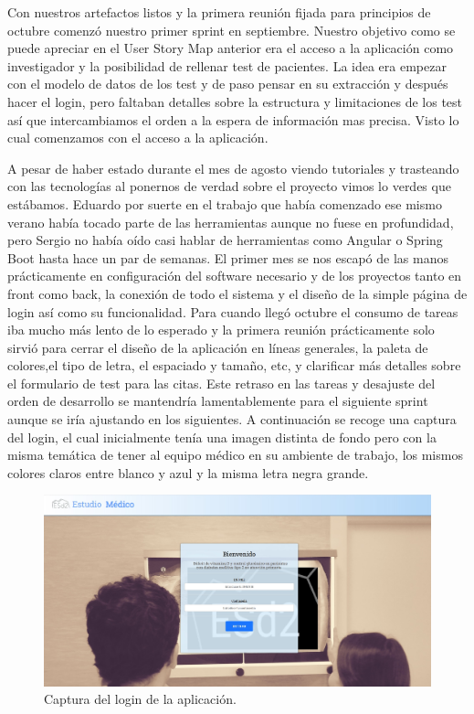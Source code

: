 Con nuestros artefactos listos y la primera reunión fijada para principios de octubre comenzó nuestro primer sprint en septiembre. Nuestro objetivo como se puede apreciar en el User Story Map anterior era el acceso a la aplicación como investigador y la posibilidad de rellenar test de pacientes. La idea era empezar con el modelo de datos de los test y de paso pensar en su extracción y después hacer el login, pero faltaban detalles sobre la estructura y limitaciones de los test así que intercambiamos el orden a la espera de información mas precisa. Visto lo cual comenzamos con el acceso a la aplicación.
\newline

A pesar de haber estado durante el mes de agosto viendo tutoriales y trasteando con las tecnologías al ponernos de verdad sobre el proyecto vimos lo verdes que estábamos. Eduardo por suerte en el trabajo que había comenzado ese mismo verano había tocado parte de las herramientas aunque no fuese en profundidad, pero Sergio no había oído casi hablar de herramientas como Angular o Spring Boot hasta hace un par de semanas. El primer mes se nos escapó de las manos prácticamente en configuración del software necesario y de los proyectos tanto en front como back, la conexión de todo el sistema y el diseño de la simple página de login así como su funcionalidad. Para cuando llegó octubre el consumo de tareas iba mucho más lento de lo esperado y la primera reunión prácticamente solo sirvió para cerrar el diseño de la aplicación en líneas generales, la paleta de colores,el tipo de letra, el espaciado y tamaño, etc, y clarificar más detalles sobre el formulario de test para las citas. Este retraso en las tareas y desajuste del orden de desarrollo se mantendría lamentablemente para el siguiente sprint aunque se iría ajustando en los siguientes. A continuación se recoge una captura del login, el cual inicialmente tenía una imagen distinta de fondo pero con la misma temática de tener al equipo médico en su ambiente de trabajo, los mismos colores claros entre blanco y azul y la misma letra negra grande.
\newline

 \begin{figure}[h]
    \centering
     \includegraphics[width=1\textwidth]{images/login.jpg}
    \caption{Captura del login de la aplicación.}
\end{figure}
\newpage


